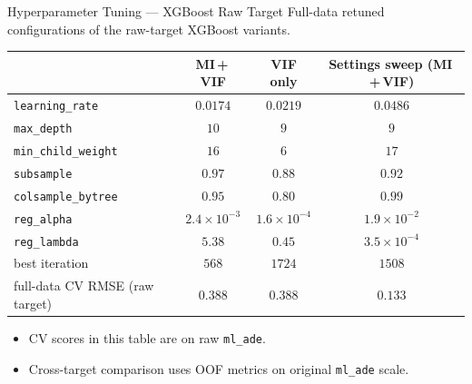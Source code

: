 \begin{frame}[noframenumbering]{Hyperparameter Tuning — XGBoost Raw Target}
  \footnotesize
  Full-data retuned configurations of the raw-target XGBoost variants.
  \vspace{0.3em}

  \scriptsize
  \renewcommand{\arraystretch}{1.05}
  \begin{center}
  \begin{tabular}{@{}lccc@{}}
    \toprule
     & \textbf{MI\,+\,VIF} & \textbf{VIF only} & \textbf{Settings sweep (MI\,+\,VIF)} \\
    \midrule
    \texttt{learning\_rate}    & $0.0174$ & $0.0219$ & $0.0486$ \\
    \texttt{max\_depth}        & $10$     & $9$      & $9$ \\
    \texttt{min\_child\_weight}& $16$     & $6$      & $17$ \\
    \texttt{subsample}         & $0.97$   & $0.88$   & $0.92$ \\
    \texttt{colsample\_bytree} & $0.95$   & $0.80$   & $0.99$ \\
    \texttt{reg\_alpha}        & $2.4\!\times\!10^{-3}$ & $1.6\!\times\!10^{-4}$ & $1.9\!\times\!10^{-2}$ \\
    \texttt{reg\_lambda}       & $5.38$                 & $0.45$                 & $3.5\!\times\!10^{-4}$ \\
    best iteration             & $568$    & $1724$   & $1508$ \\
    full-data CV RMSE (raw target) & $0.388$ & $0.388$ & $0.133$ \\
    \bottomrule
  \end{tabular}
  \end{center}

  \vspace{0.3em}
  \scriptsize
  \begin{itemize}\setlength\itemsep{0.08em}
    \item CV scores in this table are on raw \texttt{ml\_ade}.
    \item Cross-target comparison uses OOF metrics on original
      \texttt{ml\_ade} scale.
  \end{itemize}
\end{frame}

